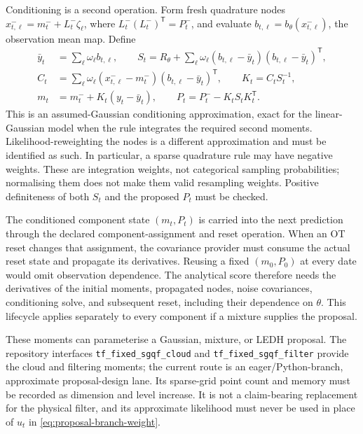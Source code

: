 \documentclass[11pt]{article}
\begin{document}
Conditioning is a second operation. Form fresh quadrature nodes
$x_{t,\ell}^-=m_t^-+L_t^-\zeta_\ell$, where
$L_t^-(L_t^-)^{\mathsf T}=P_t^-$, and evaluate
$b_{t,\ell}=b_\theta(x_{t,\ell}^-)$, the observation mean map. Define
\begin{align}
 \bar y_t&=\sum_\ell\omega_\ell b_{t,\ell},\qquad
 S_t=R_\theta+\sum_\ell\omega_\ell
 (b_{t,\ell}-\bar y_t)(b_{t,\ell}-\bar y_t)^{\mathsf T},\nonumber\\
 C_t&=\sum_\ell\omega_\ell(x_{t,\ell}^--m_t^-)
                         (b_{t,\ell}-\bar y_t)^{\mathsf T},\qquad
 K_t=C_t S_t^{-1},\nonumber\\
 m_t&=m_t^-+K_t(y_t-\bar y_t),\qquad
 P_t=P_t^--K_t S_t K_t^{\mathsf T}.       \label{eq:sgqf-conditioning}
\end{align}
This is an assumed-Gaussian conditioning approximation, exact for the
linear-Gaussian model when the rule integrates the required second moments.
Likelihood-reweighting the nodes is a different approximation and must be
identified as such. In particular, a sparse quadrature rule may have negative
weights. These are integration weights, not categorical sampling probabilities;
normalising them does not make them valid resampling weights. Positive
definiteness of both $S_t$ and the proposed $P_t$ must be checked.

The conditioned component state $(m_t,P_t)$ is carried into the next
prediction through the declared component-assignment and reset operation.
When an OT reset changes that assignment, the covariance provider must consume
the actual reset state and propagate its derivatives. Reusing a fixed
$(m_0,P_0)$ at every date would omit observation dependence. The analytical
score therefore needs the derivatives of the initial moments, propagated
nodes, noise covariances, conditioning solve, and subsequent reset, including
their dependence on $\theta$. This lifecycle applies separately to every
component if a mixture supplies the proposal.

These moments can parameterise a Gaussian, mixture, or LEDH proposal. The
repository interfaces \texttt{tf\_fixed\_sgqf\_cloud} and
\texttt{tf\_fixed\_sgqf\_filter} provide the cloud and filtering moments; the
current route is an eager/Python-branch, approximate proposal-design lane.
Its sparse-grid point count and memory must be recorded as dimension and level
increase. It is not a claim-bearing replacement for the physical filter, and
its approximate likelihood must never be used in place of $u_t$ in
\eqref{eq:proposal-branch-weight}.
\end{document}
